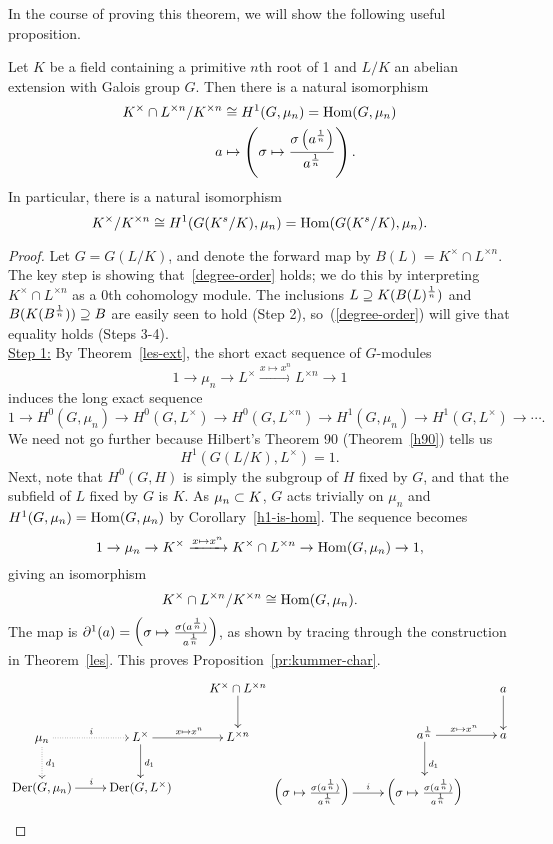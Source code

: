 In the course of proving this theorem, we will show the following useful proposition.
\begin{pr}
Let $K$ be a field containing a primitive $n$th root of 1 and $L/K$ an abelian extension with Galois group $G$. Then there is a natural isomorphism
\begin{align*}
K^{\times}\cap L^{\times n}/K^{\times n}&\cong H^1(G,\mu_n)=\operatorname{Hom}(G,\mu_n)\\
a&\mapsto \left( {\sigma \mapsto \frac{\sigma\left( {a^{\frac{1}{n}}} \right)}{a^{\frac{1}{n}}}} \right).
\end{align*}
In particular, there is a natural isomorphism
\[
K^{\times}/K^{\times n} \cong H^1(G(K^s/K),\mu_n)=\operatorname{Hom}(G(K^s/K),\mu_n).
\]
\end{pr}
\begin{proof}
Let $G=G(L/K)$, and denote the forward map by $B(L)=K^{\times}\cap L^{\times n}$. The key step is showing that~\eqref{degree-order} holds; we do this by interpreting $K^{\times}\cap L^{\times n}$ as a 0th cohomology module.  
The inclusions $L\supseteq K(B(L)^{\frac{1}{n}})$ and $B(K(B^{\frac{1}{n}}))\supseteq B$ are easily seen to hold (Step 2), so~(\ref{degree-order}) will give that equality holds (Steps 3-4).\\

\noindent\underline{Step 1:} By Theorem~\ref{les-ext}, the short exact sequence of $G$-modules 
\[
1\to \mu_n \to L^{\times}\xrightarrow{x\mapsto x^n} L^{\times n}\to 1 
\]
induces the long exact sequence
\[
1\to H^0(G,\mu_n) \to H^0(G,L^{\times})\to H^0(G,L^{\times n})\to H^1(G, \mu_n)\to H^1(G,L^{\times})\to \cdots.
\]
We need not go further because Hilbert's Theorem 90 (Theorem~\ref{h90}) tells us
\[
H^1(G(L/K), L^{\times})=1.
\]
Next, note that $H^0(G, H)$ is simply the subgroup of $H$ fixed by $G$, and that the subfield of $L$ fixed by $G$ is $K$.  %
As $\mu_n\subset K$, $G$ acts trivially on $\mu_n$ and $H^{1}(G,\mu_n)=\operatorname{Hom}(G,\mu_n)$ by Corollary~\ref{h1-is-hom}.  
The sequence becomes
\[
1\to \mu_n\to K^{\times}\xrightarrow{x\mapsto x^n} K^{\times}\cap L^{\times n} \to \operatorname{Hom}(G, \mu_n)\to 1,
\]
giving an isomorphism
\[
K^{\times}\cap L^{\times n}/K^{\times n}\cong \operatorname{Hom}(G, \mu_n).
\]
The map is $\partial^1(a)=\left( {\sigma\mapsto\frac{\sigma(a^{\frac{1}{n}})}{a^{\frac{1}{n}}}} \right)$, as shown by tracing through the construction in Theorem~\ref{les}. This proves Proposition~\ref{pr:kummer-char}.
\[
\xymatrix{
&& K^{\times}\cap L^{\times n}\ar[d]\\
\mu_n\ar@{.>}[r]^i \ar@{.>}[d]^{d_1}&  {L^{\times}}\ar[r]^{x\mapsto x^n} \ar[d]^{d_1}
& L^{\times n}\\
\Der(G, \mu_n)\ar[r]^i&\Der(G,L^{\times})\\
}
\xymatrix{
&& a\ar[d]\\
& a^{\rc n} \ar[r]^{x\mapsto x^n} \ar[d]^{d_1}
& a\\
\pa{\si\mapsto \frac{\si(a^{\rc n})}{a^{\rc n}}}\ar[r]^i&\pa{\si\mapsto \frac{\si(a^{\rc n})}{a^{\rc n}}}\\
}
\]


\end{proof}
